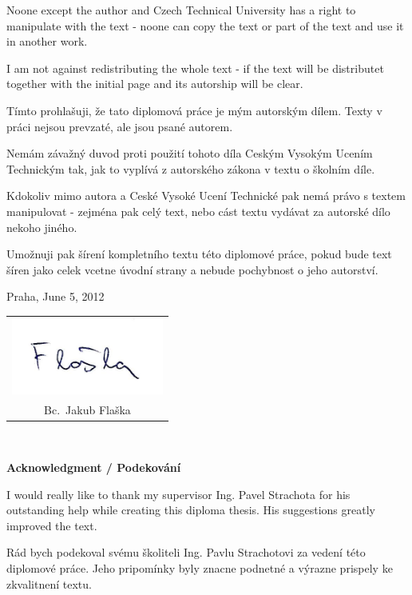 \documentclass[a4paper,12pt]{report}	%
\newcommand{\autor}{Bc.~Jakub Flaška}
\begin{document}
Noone except the author and Czech Technical University has a right to manipulate with the text - noone can copy the text or part of the text and use it in another work.

I am not against redistributing the whole text - if the text will be distributet together with the initial page and its autorship will be clear.

\vspace{10mm}

Tímto prohlašuji, že tato diplomová práce je mým autorským dílem. Texty v práci nejsou prevzaté, ale jsou psané autorem.

Nemám závažný duvod proti použití tohoto díla Ceským Vysokým Ucením Technickým tak, jak to vyplívá z autorského zákona v textu o školním díle. 

Kdokoliv mimo autora a Ceské Vysoké Ucení Technické pak nemá právo s textem manipulovat - zejména pak celý text, nebo cást textu vydávat za autorské dílo nekoho jiného.

Umožnuji pak šírení kompletního textu této diplomové práce, pokud bude text šíren jako celek vcetne úvodní strany a nebude pochybnost o jeho autorství. 

\vspace{10mm}Praha, June 5, 2012\hfill
	\begin{tabular}{c}
	\includegraphics[width=50mm]{Text/IMG/podpis.jpg}\\ 
	\autor
	\end{tabular}


\newpage
\thispagestyle{empty}

~
\vfill %

{\bf Acknowledgment / Podekování}

\vspace{5mm} %

I would really like to thank my supervisor Ing. Pavel Strachota for his outstanding help while creating this diploma thesis. His suggestions greatly improved the text.

Rád bych podekoval svému školiteli Ing. Pavlu Strachotovi za vedení této diplomové práce. Jeho pripomínky byly znacne podnetné a výrazne prispely ke zkvalitnení textu.
\end{document}
